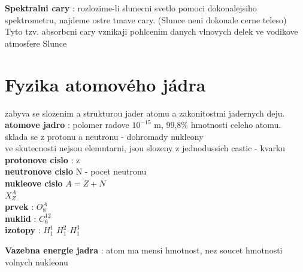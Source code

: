 \documentclass{report}
\begin{document}
\textbf{Spektralni cary} : rozlozime-li slunecni svetlo pomoci dokonalejsiho spektrometru, najdeme ostre tmave cary. (Slunce neni dokonale cerne teleso) \\
Tyto tzv. absorbcni cary vznikaji pohlcenim danych vlnovych delek ve vodikove atmosfere Slunce \\



\newpage


\section{Fyzika atomového jádra}
\vspace{0.5cm}
zabyva se slozenim a strukturou jader atomu a zakonitostmi jadernych deju. \\
\textbf{atomove jadro} : polomer radove $10^{-15}$ m, 99,8\% hmotnosti celeho atomu. \\
sklada se z protonu a neutronu - dohromady nukleony \\
ve skutecnosti nejsou elemntarni, jsou slozeny z jednodussich castic - kvarku \\
\textbf{protonove cislo} : z \\
\textbf{neutronove cislo } N - pocet neutronu \\
\textbf{nukleove cislo} $A=Z+N$ \\
$X^A_Z$ \\
\textbf{prvek} : $O^A_8$ \\
\textbf{nuklid} :  $C^{12}_6$ \\
\textbf{izotopy} : $H_1^1$  $H^2_1$  $H^3_1$ \\


\textbf{Vazebna energie jadra} : atom ma mensi hmotnost, nez soucet hmotnosti volnych nukleonu
\end{document}
